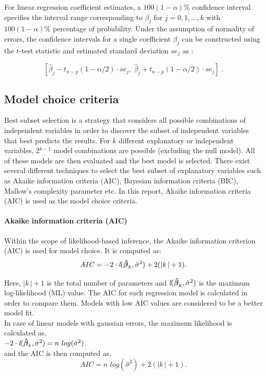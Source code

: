 \documentclass[12 pt]{scrartcl}
\begin{document}
For linear regression coefficient estimates, a $100(1-\alpha)\%$ confidence interval specifies the interval range corresponding to $\beta_j$ for $j=0,1,...,k$ with $100(1-\alpha)\%$ percentage of probability. Under the assumption of normality of errors, the confidence intervals for a single coefficient $\beta_j$ can be constructed using the $t$-test statistic and estimated standard deviation $se_j$ as \citep[p. 136]{regression}:

\[
[\hat{\beta}_j - t_{n-p}(1-{\alpha}/{2})\cdot se_j,\; \hat{\beta}_j + t_{n-p}(1-{\alpha}/{2})\cdot se_j] \;.
\]


\subsection{Model choice criteria}

Best subset selection is a strategy that considers all possible combinations of independent variables in order to discover the subset of independent variables that best predicts the results. For $k$ different explanatory or independent variables, 2$^{k-1}$ model combinations are possible (excluding the null model). All of these models are then evaluated and the best model is selected. There exist several different techniques to select the best subset of explanatory variables such as Akaike information criteria (AIC), Bayesian information criteria (BIC), Mallow's complexity parameter etc. In this report, Akaike information criteria (AIC) is used as the model choice criteria.

\paragraph{Akaike information criteria (AIC)}

Within the scope of likelihood-based inference, the Akaike information criterion (AIC) is used for model choice. It is computed as:
\[
AIC = - 2 \cdot \emph{l}(\boldsymbol{\hat{\beta}}_k, {\hat{\sigma}}^2) + 2 (\left|{k}\,\right| + 1).
\]

Here, $\left|{k}\,\right| + 1$ is the total number of parameters and $\emph{l}(\boldsymbol{\hat{\beta}}_k, {\hat{\sigma}}^2)$ is the maximum log-likelihood (ML) value. The AIC for each regression model is calculated in order to compare them. Models with low AIC values are considered to be a better model fit.\\
In case of linear models with gaussian errors, the maximum likelihood is calculated as,\\
$- 2 \cdot \emph{l}(\boldsymbol{\hat{\beta}}_k, {\hat{\sigma}}^2) = n \,\, log({\hat{\sigma}}^2)$. \\
and the AIC is then computed as,
\[
AIC = n \,\, log({\hat{\sigma}}^2) + 2 (\left|{k}\,\right| + 1).
\]
\citep[p.~146-148]{regression}
\end{document}
